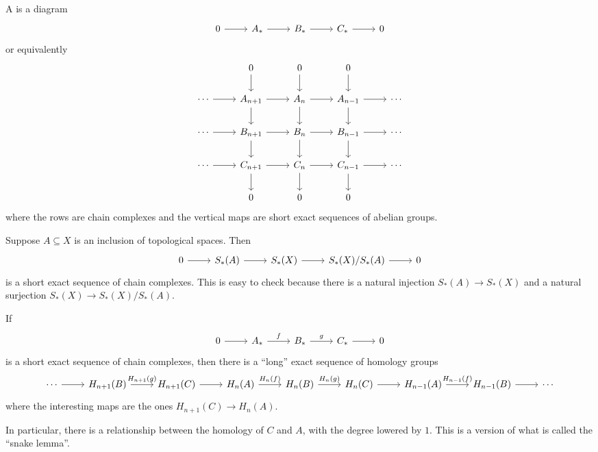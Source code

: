 \documentclass{standalone}
\begin{document}
\begin{definition}
  A  is a diagram
  \[
    \begin{tikzcd}
    	0 \ar[r] &
    	A_* \ar[r] &
    	B_* \ar[r] &
    	C_* \ar[r] &
    	0
    \end{tikzcd}
  \]
  or equivalently
  \[
    \begin{tikzcd}
    	 &
    	0 \ar[d] &
    	0 \ar[d] &
    	0 \ar[d] &
    	\\
    	\cdots \ar[r] &
    	A_{n+1} \ar[r] \ar[d] &
    	A_n     \ar[r] \ar[d] &
    	A_{n-1} \ar[r] \ar[d] &
    	\cdots \\
    	\cdots \ar[r] &
    	B_{n+1} \ar[r] \ar[d] &
    	B_n     \ar[r] \ar[d] &
    	B_{n-1} \ar[r] \ar[d] &
    	\cdots \\
    	\cdots  \ar[r] &
    	C_{n+1} \ar[r] \ar[d] &
    	C_n     \ar[r] \ar[d] &
    	C_{n-1} \ar[r] \ar[d] &
    	\cdots \\
    	&
    	0 &
    	0 &
    	0 &
    \end{tikzcd}
  \]
  where the rows are chain complexes and the vertical maps are
  short exact sequences of abelian groups.
\end{definition}

\begin{example}
  Suppose \(A \subseteq X\) is an inclusion of topological spaces. Then
  \[
    \begin{tikzcd}
    	0 \ar[r] &
    	S_*(A) \ar[r] &
    	S_*(X) \ar[r] &
    	S_*(X)/S_*(A) \ar[r] &
    	0
    \end{tikzcd}
  \]
  is a short exact sequence of chain complexes.
  This is easy to check because there is a natural injection
  \(S_*(A) \to S_*(X)\) and a natural surjection \(S_*(X) \to S_*(X)/S_*(A)\).
\end{example}

\begin{theorem}
  If
  \[
    \begin{tikzcd}
    	0 \ar[r] &
    	A_* \ar[r, "f"] &
    	B_* \ar[r, "g"] &
    	C_* \ar[r] &
    	0
    \end{tikzcd}
  \]
  is a short exact sequence of chain complexes, then there is
  a ``long'' exact sequence of homology groups
  \[
    \begin{tikzcd}
      \cdots \ar[r] &
    	H_{n+1}(B) \ar[r, "H_{n+1}(g)"] &
    	H_{n+1}(C) \ar[r] &
    	H_n(A)     \ar[r, "H_{n}(f)"] &
    	H_n(B)     \ar[r, "H_{n}(g)"] &
    	H_n(C)     \ar[r] &
    	H_{n-1}(A) \ar[r, "H_{n-1}(f)"] &
    	H_{n-1}(B) \ar[r] &
    	\cdots
    \end{tikzcd}
  \]
  where the interesting maps are the ones \(H_{n+1}(C) \to H_n(A)\).
\end{theorem}
In particular, there is a relationship between the homology of \(C\) and \(A\),
with the degree lowered by \(1\).
This is a version of what is called the ``snake lemma''.
\end{document}
